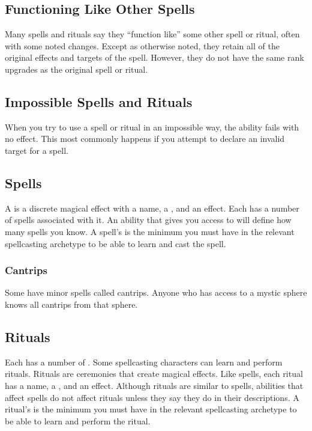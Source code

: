     \subsection{Functioning Like Other Spells}\label{Functioning Like Other Spells}
        Many spells and rituals say they ``function like'' some other spell or ritual, often with some noted changes.
        Except as otherwise noted, they retain all of the original effects and targets of the spell.
        However, they do not have the same rank upgrades as the original spell or ritual.

    \subsection{Impossible Spells and Rituals}
        When you try to use a spell or ritual in an impossible way, the ability fails with no effect.
        This most commonly happens if you attempt to declare an invalid target for a spell.

    \subsection{Spells}\label{Spells}
        A  is a discrete magical effect with a name, a , and an effect.
        Each  has a number of spells associated with it.
        An ability that gives you access to  will define how many spells you know.
        A spell's  is the minimum  you must have in the relevant spellcasting archetype to be able to learn and cast the spell.

        \subsubsection{Cantrips}\label{Cantrips}
            Some  have minor spells called cantrips.
            Anyone who has access to a mystic sphere knows all cantrips from that sphere.

    \subsection{Rituals}\label{Rituals}
        Each  has a number of .
        Some spellcasting characters can learn and perform rituals.
        Rituals are ceremonies that create magical effects.
        Like spells, each ritual has a name, a , and an effect.
        Although rituals are similar to spells, abilities that affect spells do not affect rituals unless they say they do in their descriptions.
        A ritual's  is the minimum  you must have in the relevant spellcasting archetype to be able to learn and perform the ritual.

